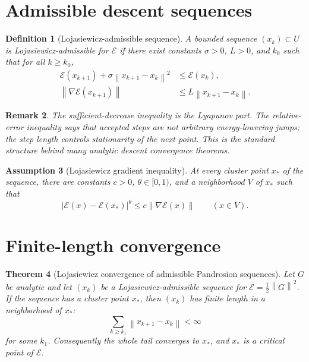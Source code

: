 \documentclass[11pt]{article}
\newtheorem{definition}{Definition}[section]
\newtheorem{assumption}[definition]{Assumption}
\newtheorem{theorem}[definition]{Theorem}
\newtheorem{remark}[definition]{Remark}
\newcommand{\E}{\mathcal E}
\newcommand{\norm}[1]{\left\lVert #1\right\rVert}
\begin{document}
\section{Admissible descent sequences}

\begin{definition}[Lojasiewicz-admissible sequence]
A bounded sequence \((x_k)\subset U\) is Lojasiewicz-admissible for \(\E\) if there exist constants \(\sigma>0\), \(L>0\), and \(k_0\) such that for all \(k\ge k_0\),
\begin{align}
        \E(x_{k+1})+\sigma\norm{x_{k+1}-x_k}^2 &\le \E(x_k), \label{eq:suff-decrease}\\
        \norm{\nabla \E(x_{k+1})} &\le L\norm{x_{k+1}-x_k}. \label{eq:relative-error}
\end{align}
\end{definition}

\begin{remark}
The sufficient-decrease inequality is the Lyapunov part. The relative-error inequality says that accepted steps are not arbitrary energy-lowering jumps; the step length controls stationarity of the next point. This is the standard structure behind many analytic descent convergence theorems.
\end{remark}

\begin{assumption}[Lojasiewicz gradient inequality]
At every cluster point \(x_\ast\) of the sequence, there are constants \(c>0\), \(\theta\in[0,1)\), and a neighborhood \(V\) of \(x_\ast\) such that
\[
        |\E(x)-\E(x_\ast)|^\theta
        \le
        c\norm{\nabla \E(x)}
        \qquad (x\in V).
\]
\end{assumption}

\section{Finite-length convergence}

\begin{theorem}[Lojasiewicz convergence of admissible Pandrosion sequences]\label{thm:kl}
Let \(G\) be analytic and let \((x_k)\) be a Lojasiewicz-admissible sequence for \(\E=\frac12\norm{G}^2\). If the sequence has a cluster point \(x_\ast\), then \((x_k)\) has finite length in a neighborhood of \(x_\ast\):
\[
        \sum_{k\ge k_1}\norm{x_{k+1}-x_k}<\infty
\]
for some \(k_1\). Consequently the whole tail converges to \(x_\ast\), and \(x_\ast\) is a critical point of \(\E\).
\end{theorem}
\end{document}
